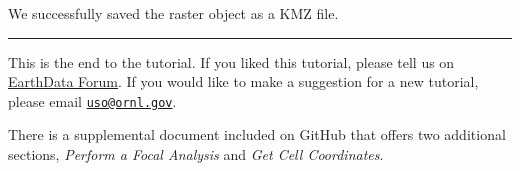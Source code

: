 \documentclass[
]{article}
\begin{document}
We successfully saved the raster object as a KMZ file.

\begin{center}\rule{0.5\linewidth}{0.5pt}\end{center}

This is the end to the tutorial. If you liked this tutorial, please tell
us on \href{https://forum.earthdata.nasa.gov/}{EarthData Forum}. If you
would like to make a suggestion for a new tutorial, please email
\href{mailto:uso@ornl.gov}{\nolinkurl{uso@ornl.gov}}.

There is a supplemental document included on GitHub that offers two
additional sections, \emph{Perform a Focal Analysis} and \emph{Get Cell
Coordinates}.
\end{document}
